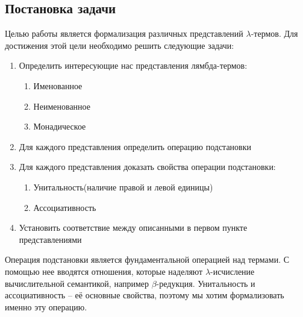 \subsection{Постановка задачи}

Целью работы является формализация различных представлений $\lambda$-термов. Для достижения этой цели необходимо решить следующие задачи:

\begin{enumerate}
  \item Определить интересующие нас представления лямбда-термов:
    \begin{enumerate}
      \item Именованное
      \item Неименованное
      \item Монадическое
    \end{enumerate}
  \item Для каждого представления определить операцию подстановки
  \item Для каждого представления доказать свойства операции подстановки:
    \begin{enumerate}
      \item Унитальность(наличие правой и левой единицы)
      \item Ассоциативность
    \end{enumerate}
  \item Установить соответствие между описанными в первом пункте представлениями
\end{enumerate}

Операция подстановки является фундаментальной операцией над термами. С помощью нее вводятся отношения, которые наделяют $\lambda$-исчисление вычислительной семантикой, например $\beta$-редукция. Унитальность и ассоциативность -- её основные свойства, поэтому мы хотим формализовать именно эту операцию.
